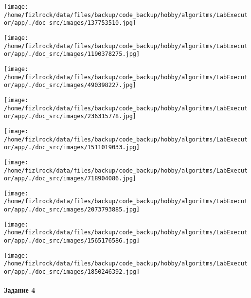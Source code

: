 \documentclass[a4paper, 12pt]{article}
\begin{document}
\texttt{[image: /home/fizlrock/data/files/backup/code\_backup/hobby/algoritms/LabExecutor/app/./doc\_src/images/137753510.jpg]}

\texttt{[image: /home/fizlrock/data/files/backup/code\_backup/hobby/algoritms/LabExecutor/app/./doc\_src/images/1190378275.jpg]}

\texttt{[image: /home/fizlrock/data/files/backup/code\_backup/hobby/algoritms/LabExecutor/app/./doc\_src/images/490398227.jpg]}

\texttt{[image: /home/fizlrock/data/files/backup/code\_backup/hobby/algoritms/LabExecutor/app/./doc\_src/images/236315778.jpg]}

\texttt{[image: /home/fizlrock/data/files/backup/code\_backup/hobby/algoritms/LabExecutor/app/./doc\_src/images/1511019033.jpg]}

\texttt{[image: /home/fizlrock/data/files/backup/code\_backup/hobby/algoritms/LabExecutor/app/./doc\_src/images/718904086.jpg]}

\texttt{[image: /home/fizlrock/data/files/backup/code\_backup/hobby/algoritms/LabExecutor/app/./doc\_src/images/2073793885.jpg]}

\texttt{[image: /home/fizlrock/data/files/backup/code\_backup/hobby/algoritms/LabExecutor/app/./doc\_src/images/1565176586.jpg]}

\texttt{[image: /home/fizlrock/data/files/backup/code\_backup/hobby/algoritms/LabExecutor/app/./doc\_src/images/1850246392.jpg]}
\pagebreak
\paragraph{Задание 4}
\end{document}
